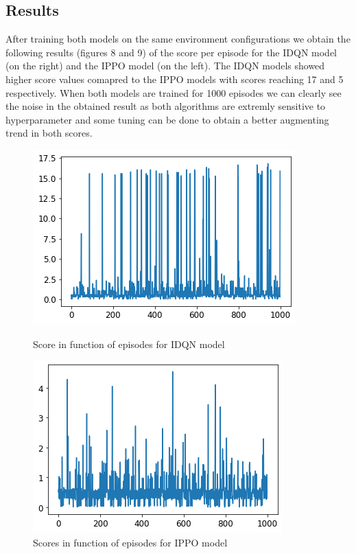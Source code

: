 \documentclass[conference]{IEEEtran}
\begin{document}
\subsection{Results}
After training both models on the same environment configurations we obtain the following results (figures 8 and 9) of the score per episode for the IDQN model (on the right) and the IPPO model (on the left).
The IDQN models showed higher score values comapred to the IPPO models with scores reaching 17 and 5 respectively. When both models are trained for 1000 episodes
we can clearly see the noise in the obtained result as both algorithms are extremly sensitive to hyperparameter and some tuning can be done to obtain a better augmenting trend in both scores.
\begin{figure}[hbt!]
    \vspace*{0.2cm}
    \centering
    \begin{minipage}[b]{1.0\linewidth}
      \includegraphics[width=\textwidth]{images/idqn-res.png}
      \caption{Score in function of episodes for IDQN model}
    \end{minipage}
    \hfill
    \begin{minipage}[b]{1.0\linewidth}
      \includegraphics[width=\textwidth]{images/ppo_res.png}
      \caption{Scores in function of episodes for IPPO model}
    \end{minipage}
  \end{figure}
\end{document}
